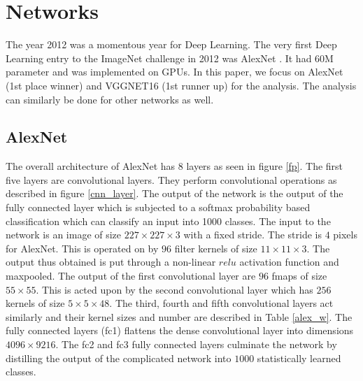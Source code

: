 \documentclass[conference]{IEEEtran}
\begin{document}
\section{Networks}
The year 2012 was a momentous year for Deep Learning. The very first Deep Learning entry to the ImageNet challenge \cite{ILSVRC15}  in 2012 was AlexNet \cite{krizhevsky2012imagenet}. It had 60M parameter and was implemented on GPUs. In this paper, we focus on AlexNet  (1st place winner) and VGGNET16 (1st runner up) for the analysis. The analysis can similarly be done for other networks as well.

\subsection{AlexNet}
The overall architecture of AlexNet has 8 layers as seen in figure \ref{fp}. The first five layers are convolutional layers. They perform convolutional operations as described in figure \ref{cnn_layer}. The output of the network is the output of the fully connected layer which is subjected to a softmax probability based classification which can classify an input into  1000 classes. The input to the network is an image of size $227 \times 227 \times 3$ with a fixed stride. The stride is $4$ pixels for AlexNet.
This is operated on by  $96$ filter kernels of size $11 \times 11 \times 3$. The output thus obtained is put through a non-linear $relu$ activation function and maxpooled. The output of the first convolutional layer are $96$ fmaps of size $55 \times 55$. This is acted upon by the second convolutional layer which has $256$ kernels of size $5 \times 5 \times 48$. The third, fourth and fifth convolutional layers act similarly and their kernel sizes and number are described in Table \ref{alex_w}. The fully connected layers (fc1) flattens the dense convolutional layer into dimensions $4096 \times 9216$. The fc2 and fc3 fully connected layers culminate the network by distilling the output of the complicated network into $1000$ statistically learned classes. 
\end{document}
